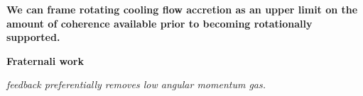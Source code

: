 \documentclass[fleqn,usenatbib]{mnras}
\begin{document}

\textbf{We can frame rotating cooling flow accretion as an upper limit on the amount of coherence available prior to becoming rotationally supported.}

\cite{Stewart2013, Danovich2015}

\textbf{Fraternali work}

\textit{
\cite{Ubler2014} feedback preferentially removes low angular momentum gas.
}




\end{document}
